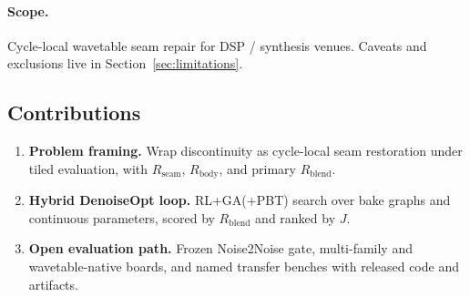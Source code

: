 \paragraph{Scope.}
Cycle-local wavetable seam repair for DSP / synthesis venues.
Caveats and exclusions live in Section~\ref{sec:limitations}.

\subsection{Contributions}
\label{sec:contributions}
\begin{enumerate}
  \item \textbf{Problem framing.} Wrap discontinuity as cycle-local seam restoration under tiled evaluation, with $R_{\mathrm{seam}}$, $R_{\mathrm{body}}$, and primary $R_{\mathrm{blend}}$.
  \item \textbf{Hybrid DenoiseOpt loop.} RL+GA(+PBT) search over bake graphs and continuous parameters, scored by $R_{\mathrm{blend}}$ and ranked by $J$.
  \item \textbf{Open evaluation path.} Frozen Noise2Noise gate, multi-family and wavetable-native boards, and named transfer benches with released code and artifacts.
\end{enumerate}
